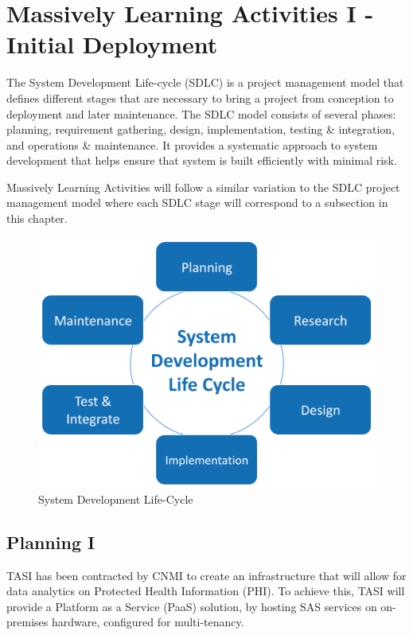 \section{Massively Learning Activities I - Initial Deployment} \label{section: MLA}
The System Development Life-cycle (SDLC) is a project management model that defines different stages that are necessary to bring a project from conception to deployment and later maintenance. The SDLC model consists of several phases: planning, requirement gathering, design, implementation, testing \& integration, and operations \& maintenance. It provides a systematic approach to system development that helps ensure that system is built efficiently with minimal risk.

Massively Learning Activities will follow a similar variation to the SDLC project management model where each SDLC stage will correspond to a subsection in this chapter.

\begin{figure}[H]
    \centering
    \includegraphics[scale = 0.65]{images/SDLC.png}
    \caption{System Development Life-Cycle}
    \label{SDLC}
\end{figure} 


\subsection{Planning I} 

TASI has been contracted by CNMI to create an infrastructure that will allow for data analytics on Protected Health Information (PHI). To achieve this, TASI will provide a Platform as a Service (PaaS) solution, by hosting SAS services on on-premises hardware, configured for multi-tenancy.

